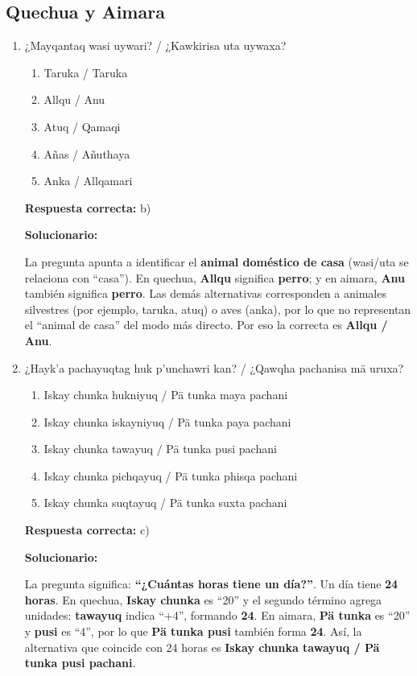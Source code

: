 \subsection*{Quechua y Aimara}

\begin{enumerate}[resume]
	
\item ¿Mayqantaq wasi uywari? / ¿Kawkirisa uta uywaxa?
\begin{enumerate}[label=\alph*)]
	\item Taruka / Taruka
	\item Allqu / Anu
	\item Atuq / Qamaqi
	\item Añas / Añuthaya
	\item Anka / Allqamari
\end{enumerate}

\textbf{Respuesta correcta:} b)

\vspace{2mm}
\textbf{Solucionario:}

La pregunta apunta a identificar el \textbf{animal doméstico de casa} (wasi/uta se relaciona con “casa”). 
En quechua, \textbf{Allqu} significa \textbf{perro}; y en aimara, \textbf{Anu} también significa \textbf{perro}. 
Las demás alternativas corresponden a animales silvestres (por ejemplo, taruka, atuq) o aves (anka), por lo que no representan el “animal de casa” del modo más directo. Por eso la correcta es \textbf{Allqu / Anu}.


\item ¿Hayk'a pachayuqtag huk p'unchawri kan? / ¿Qawqha pachanisa mä uruxa?
\begin{enumerate}[label=\alph*)]
	\item Iskay chunka hukniyuq / Pä tunka maya pachani
	\item Iskay chunka iskayniyuq / Pä tunka paya pachani
	\item Iskay chunka tawayuq / Pä tunka pusi pachani
	\item Iskay chunka pichqayuq / Pä tunka phisqa pachani
	\item Iskay chunka suqtayuq / Pä tunka suxta pachani
\end{enumerate}

\textbf{Respuesta correcta:} c)

\vspace{2mm}
\textbf{Solucionario:}

La pregunta significa: \textbf{“¿Cuántas horas tiene un día?”}. Un día tiene \textbf{24 horas}.  
En quechua, \textbf{Iskay chunka} es “20” y el segundo término agrega unidades: \textbf{tawayuq} indica “+4”, formando \textbf{24}.  
En aimara, \textbf{Pä tunka} es “20” y \textbf{pusi} es “4”, por lo que \textbf{Pä tunka pusi} también forma \textbf{24}.  
Así, la alternativa que coincide con 24 horas es \textbf{Iskay chunka tawayuq / Pä tunka pusi pachani}.

\end{enumerate}


